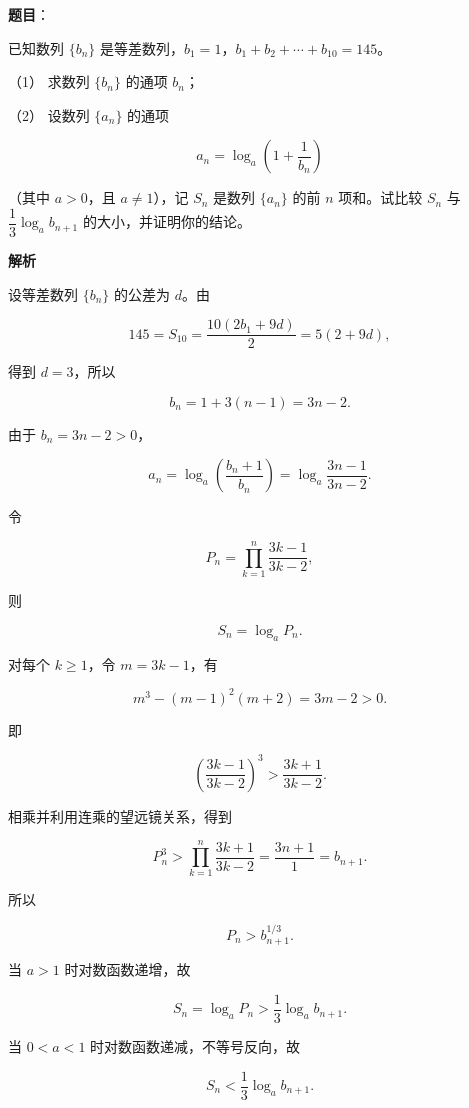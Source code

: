 \begin{answer}

\textbf{题目}：

已知数列 $\{b_n\}$ 是等差数列，$b_1=1$，$b_1+b_2+\cdots+b_{10}=145$。

（1） 求数列 $\{b_n\}$ 的通项 $b_n$；

（2） 设数列 $\{a_n\}$ 的通项

\nopagebreak[4]
\[
a_n=\log_a\left(1+\frac1{b_n}\right)
\]

（其中 $a>0$，且 $a\ne1$），记 $S_n$ 是数列 $\{a_n\}$ 的前 $n$ 项和。试比较 $S_n$ 与 $\dfrac13\log_a b_{n+1}$ 的大小，并证明你的结论。

\textbf{解析}


设等差数列 $\{b_n\}$ 的公差为 $d$。由

\nopagebreak[4]
\[
145=S_{10}=\frac{10(2b_1+9d)}2
=5(2+9d),
\]

得到 $d=3$，所以

\nopagebreak[4]
\[
b_n=1+3(n-1)=3n-2.
\]


由于 $b_n=3n-2>0$，

\nopagebreak[4]
\[
a_n=\log_a\left(\frac{b_n+1}{b_n}\right)
=\log_a\frac{3n-1}{3n-2}.
\]

令

\nopagebreak[4]
\[
P_n=\prod_{k=1}^n\frac{3k-1}{3k-2},
\]

则

\nopagebreak[4]
\[
S_n=\log_a P_n.
\]

对每个 $k\ge1$，令 $m=3k-1$，有

\nopagebreak[4]
\[
m^3-(m-1)^2(m+2)=3m-2>0.
\]

即

\nopagebreak[4]
\[
\left(\frac{3k-1}{3k-2}\right)^3
>\frac{3k+1}{3k-2}.
\]

相乘并利用连乘的望远镜关系，得到

\nopagebreak[4]
\[
P_n^3
>
\prod_{k=1}^n\frac{3k+1}{3k-2}
=\frac{3n+1}{1}
=b_{n+1}.
\]

所以

\nopagebreak[4]
\[
P_n>b_{n+1}^{1/3}.
\]

当 $a>1$ 时对数函数递增，故

\nopagebreak[4]
\[
S_n=\log_aP_n
>\frac13\log_ab_{n+1}.
\]

当 $0<a<1$ 时对数函数递减，不等号反向，故

\nopagebreak[4]
\[
S_n<\frac13\log_ab_{n+1}.
\]



\end{answer}